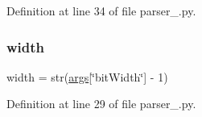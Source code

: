 Definition at line 34 of file parser\+\_.\+py.

\mbox{\label{namespaceparser__1_a5558ace5433f9aabbf0a0ec059900d94}} 
\subsubsection{\texorpdfstring{width}{width}}
{\footnotesize\ttfamily width = str(\hyperlink{namespaceparser__1_a8187411843a6284ffb964ef3fb9fcab3}{args}\mbox{[}\char`\"{}bit\+Width\char`\"{}\mbox{]} -\/ 1)}



Definition at line 29 of file parser\+\_.\+py.

